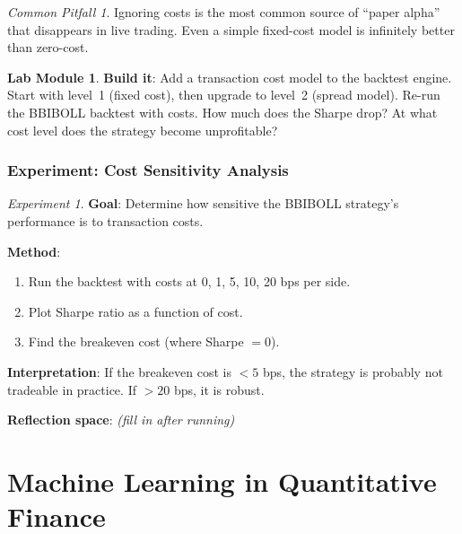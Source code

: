 \documentclass[a4paper, 11pt]{report}
\theoremstyle{definition}
\newtheorem{labmod}{Lab Module}[chapter]
\theoremstyle{remark}
\newtheorem{experiment}{Experiment}[chapter]
\newtheorem{pitfall}{Common Pitfall}[chapter]
\begin{document}
\begin{pitfall}
    Ignoring costs is the most common source of ``paper alpha'' that disappears
    in live trading.  Even a simple fixed-cost model is infinitely better than
    zero-cost.
\end{pitfall}

\begin{labmod}
    \textbf{Build it}: Add a transaction cost model to the backtest engine.
    Start with level~1 (fixed cost), then upgrade to level~2 (spread model).
    Re-run the BBIBOLL backtest with costs.  How much does the Sharpe drop?
    At what cost level does the strategy become unprofitable?
\end{labmod}

\section{Experiment: Cost Sensitivity Analysis}

\begin{experiment}
    \textbf{Goal}: Determine how sensitive the BBIBOLL strategy's performance
    is to transaction costs.

    \textbf{Method}:
    \begin{enumerate}
        \item Run the backtest with costs at 0, 1, 5, 10, 20 bps per side.
        \item Plot Sharpe ratio as a function of cost.
        \item Find the breakeven cost (where Sharpe $= 0$).
    \end{enumerate}

    \textbf{Interpretation}: If the breakeven cost is $< 5$ bps, the strategy
    is probably not tradeable in practice.  If $> 20$ bps, it is robust.

    \textbf{Reflection space}: \emph{(fill in after running)}
\end{experiment}



\part{Machine Learning in Quantitative Finance}
\label{part:ml}
\end{document}
